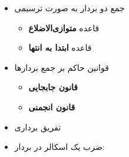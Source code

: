 \ELhold


\begin{ELunit}

\begin{itemize}
\tightlist
\item
  جمع دو بردار به صورت ترسیمی

  \begin{itemize}
  \tightlist
  \item
    قاعده \textbf{متوازی‌الاضلاع}
  \item
    قاعده \textbf{ابتدا به انتها}
  \end{itemize}
\end{itemize}


\begin{itemize}
\tightlist
\item
  قوانین حاکم بر جمع بردارها

  \begin{itemize}
  \item
    \textbf{قانون جابجایی}
  \item
    \textbf{قانون انجمنی}
  \end{itemize}
\end{itemize}

\end{ELunit}

\ELhold


\begin{ELunit}

\begin{itemize}
\tightlist
\item
  تفریق برداری
\end{itemize}



\end{ELunit}

\ELhold


\begin{ELunit}


\begin{itemize}
\tightlist
\item
  ضرب یک اسکالر در بردار:
\end{itemize}


\end{ELunit}

